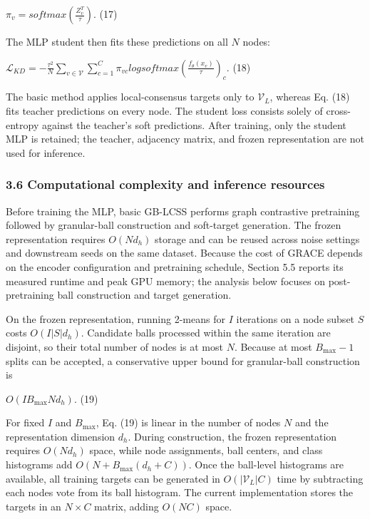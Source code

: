\(\pi_{v} = softmax\left( \frac{Z_{v}^{T}}{\tau} \right).\) (17)

The MLP student then fits these predictions on all \(N\) nodes:

\(\mathcal{L}_{KD} = - \frac{\tau^{2}}{N}\sum_{v \in \mathcal{V}}^{}{\sum_{c = 1}^{C}\pi_{vc}}logsoftmax\left( \frac{f_{\theta}(x_{v})}{\tau} \right)_{c}.\) (18)

The basic method applies local-consensus targets only to \(\mathcal{V}_{L}\), whereas Eq. (18) fits teacher predictions on every node. The student loss consists solely of cross-entropy against the teacher's soft predictions. After training, only the student MLP is retained; the teacher, adjacency matrix, and frozen representation are not used for inference.

\subsubsection{3.6 Computational complexity and inference resources}\label{computational-complexity-and-inference-resources}

Before training the MLP, basic GB-LCSS performs graph contrastive pretraining followed by granular-ball construction and soft-target generation. The frozen representation requires \(O(Nd_{h})\) storage and can be reused across noise settings and downstream seeds on the same dataset. Because the cost of GRACE depends on the encoder configuration and pretraining schedule, Section 5.5 reports its measured runtime and peak GPU memory; the analysis below focuses on post-pretraining ball construction and target generation.

On the frozen representation, running 2-means for \(I\) iterations on a node subset \(S\) costs \(O(I|S|d_{h})\). Candidate balls processed within the same iteration are disjoint, so their total number of nodes is at most \(N\). Because at most \(B_{\max} - 1\) splits can be accepted, a conservative upper bound for granular-ball construction is

\(O(IB_{\max}Nd_{h}).\) (19)

For fixed \(I\) and \(B_{\max}\), Eq. (19) is linear in the number of nodes \(N\) and the representation dimension \(d_{h}\). During construction, the frozen representation requires \(O(Nd_{h})\) space, while node assignments, ball centers, and class histograms add \(O(N + B_{\max}(d_{h} + C))\). Once the ball-level histograms are available, all training targets can be generated in \(O(|\mathcal{V}_{L}|C)\) time by subtracting each node\textquotesingle s vote from its ball histogram. The current implementation stores the targets in an \(N \times C\) matrix, adding \(O(NC)\) space.

